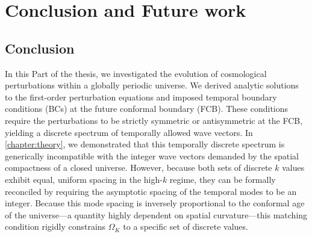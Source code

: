 \chapter{Conclusion and Future work}\label{chapter:conclusion_matter_evol}



\section{Conclusion}
In this Part of the thesis, we investigated the evolution of cosmological perturbations within a globally periodic universe. We derived analytic solutions to the first-order perturbation equations and imposed temporal boundary conditions (BCs) at the future conformal boundary (FCB). These conditions require the perturbations to be strictly symmetric or antisymmetric at the FCB, yielding a discrete spectrum of temporally allowed wave vectors. In \cref{chapter:theory}, we demonstrated that this temporally discrete spectrum is generically incompatible with the integer wave vectors demanded by the spatial compactness of a closed universe. However, because both sets of discrete \(k\) values exhibit equal, uniform spacing in the high-\(k\) regime, they can be formally reconciled by requiring the asymptotic spacing of the temporal modes to be an integer. Because this mode spacing is inversely proportional to the conformal age of the universe—a quantity highly dependent on spatial curvature—this matching condition rigidly constrains $\Omega_K$ to a specific set of discrete values. 

